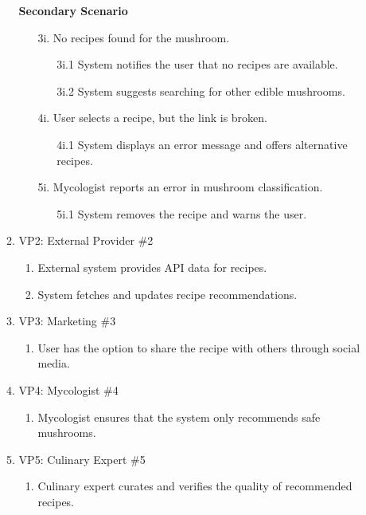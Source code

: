\documentclass[]{article}
\begin{document}
\begin{enumerate}[{\bf BE1.}]
\begin{enumerate}[{\bf VP1.}]
		\textbf{Secondary Scenario}
		\begin{enumerate}
			\item[3i.] No recipes found for the mushroom.
			\begin{enumerate}
				\item[3i.1] System notifies the user that no recipes are available.
				\item[3i.2] System suggests searching for other edible mushrooms.
			\end{enumerate}
			\item[4i.] User selects a recipe, but the link is broken.
			\begin{enumerate}
				\item[4i.1] System displays an error message and offers alternative recipes.
			\end{enumerate}
			\item[5i.] Mycologist reports an error in mushroom classification.
			\begin{enumerate}
				\item[5i.1] System removes the recipe and warns the user.
			\end{enumerate}
		\end{enumerate}
		
		\item VP2: External Provider \#2
		\begin{enumerate}
			\item External system provides API data for recipes.
			\item System fetches and updates recipe recommendations.
		\end{enumerate}
		
		\item VP3: Marketing \#3
		\begin{enumerate}
			\item User has the option to share the recipe with others through social media.
		\end{enumerate}
		
		\item VP4: Mycologist \#4
		\begin{enumerate}
			\item Mycologist ensures that the system only recommends safe mushrooms.
		\end{enumerate}
		
		\item VP5: Culinary Expert \#5
		\begin{enumerate}
			\item Culinary expert curates and verifies the quality of recommended recipes.
		\end{enumerate}
	\end{enumerate}
		

\end{enumerate}
\end{document}
